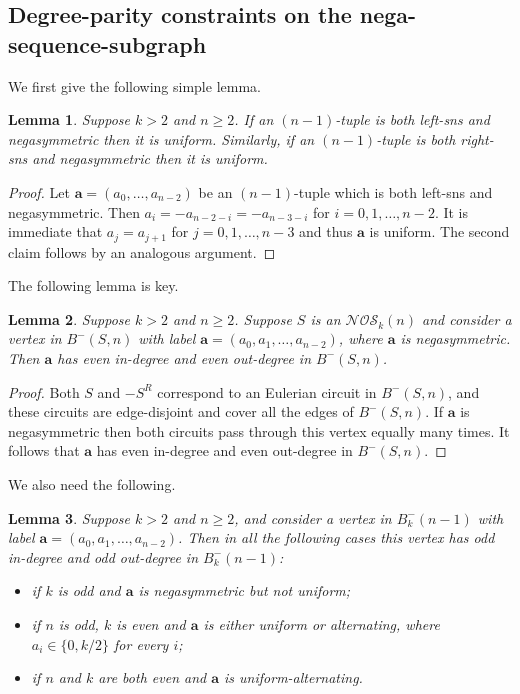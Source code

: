 \documentclass[a4paper,11pt]{article}
\theoremstyle{plain}
\newtheorem{lemma}{Lemma}[section]
\theoremstyle{definition}
\theoremstyle{remark}
\begin{document}
\subsection{Degree-parity constraints on the nega-sequence-subgraph}
\label{subsection:NOS-degree-parity-constraints}

We first give the following simple lemma.

\begin{lemma}  \label{lemma:ns-symmetric_not_symmetric}
Suppose $k>2$ and $n\geq2$.  If an $(n-1)$-tuple is both left-sns and negasymmetric then it is
uniform. Similarly, if an $(n-1)$-tuple is both right-sns and negasymmetric then it is uniform.
\end{lemma}

\begin{proof}
Let $\mathbf a=(a_0,\dots,a_{n-2})$ be an $(n-1)$-tuple which is both left-sns and negasymmetric.
Then $a_i=-a_{n-2-i}=-a_{n-3-i}$ for $i=0,1,\dots,n-2$. It is immediate that $a_j=a_{j+1}$ for
$j=0,1,\dots,n-3$ and thus $\mathbf a$ is uniform. The second claim follows by an analogous
argument.
\end{proof}


The following lemma is key.

\begin{lemma}  \label{lemma:NOS_negasymmetric_vertex_even_degree}
Suppose $k>2$ and $n\geq2$.  Suppose $S$ is an $\mathcal{NOS}_k(n)$ and consider a vertex in
$B^-(S,n)$ with label $\mathbf{a}=(a_0,a_1,\ldots,a_{n-2})$, where $\mathbf{a}$ is
negasymmetric. Then $\mathbf{a}$ has even in-degree and even out-degree in $B^-(S,n)$.
\end{lemma}

\begin{proof}
Both $S$ and $-S^R$ correspond to an Eulerian circuit in $B^-(S,n)$, and these circuits are
edge-disjoint and cover all the edges of $B^-(S,n)$. If $\mathbf{a}$ is negasymmetric then both
circuits pass through this vertex equally many times. It follows that $\mathbf{a}$ has even
in-degree and even out-degree in $B^-(S,n)$.
\end{proof}

We also need the following.

\begin{lemma}  \label{lemma:B-vertex-parity}
Suppose $k>2$ and $n\geq2$, and consider a vertex in $B^-_k(n-1)$ with label
$\mathbf{a}=(a_0,a_1,\ldots,a_{n-2})$.  Then in all the following cases this vertex has odd
in-degree and odd out-degree in $B^-_k(n-1)$:
\begin{itemize}
\item[i)] if $k$ is odd and $\mathbf{a}$ is negasymmetric but not uniform;
\item[ii)] if $n$ is odd, $k$ is even and $\mathbf{a}$ is either uniform or alternating, where
    $a_i\in\{0,k/2\}$ for every $i$;
\item[iii)] if $n$ and $k$ are both even and $\mathbf{a}$ is uniform-alternating.
\end{itemize}
\end{lemma}
\end{document}
